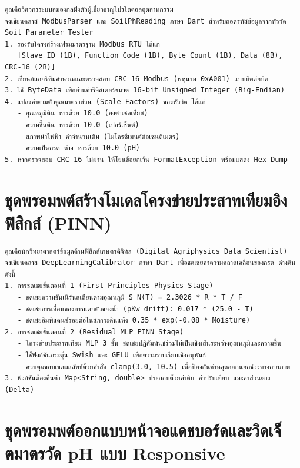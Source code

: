 \begin{promptbox}[title={พรอมพต์ ก.2 การเขียนโมดูลถอดรหัส Modbus RTU และตรวจสอบ CRC-16}]
\begin{lstlisting}
คุณคือวิศวกรระบบสมองกลฝังตัวผู้เชี่ยวชาญโปรโตคอลอุตสาหกรรม
จงเขียนคลาส ModbusParser และ SoilPhReading ภาษา Dart สำหรับถอดรหัสข้อมูลจากหัววัด Soil Parameter Tester
1. รองรับโครงสร้างเฟรมมาตรฐาน Modbus RTU ได้แก่
   [Slave ID (1B), Function Code (1B), Byte Count (1B), Data (8B), CRC-16 (2B)]
2. เขียนอัลกอริทึมคำนวณและตรวจสอบ CRC-16 Modbus (พหุนาม 0xA001) แบบบิตต่อบิต
3. ใช้ ByteData เพื่ออ่านค่ารีจิสเตอร์ขนาด 16-bit Unsigned Integer (Big-Endian)
4. แปลงค่าตามตัวคูณมาตราส่วน (Scale Factors) ของหัววัด ได้แก่
   - อุณหภูมิดิน หารด้วย 10.0 (องศาเซลเซียส)
   - ความชื้นดิน หารด้วย 10.0 (เปอร์เซ็นต์)
   - สภาพนำไฟฟ้า ค่าจำนวนเต็ม (ไมโครซีเมนต์ต่อเซนติเมตร)
   - ความเป็นกรด-ด่าง หารด้วย 10.0 (pH)
5. หากตรวจสอบ CRC-16 ไม่ผ่าน ให้โยนข้อยกเว้น FormatException พร้อมแสดง Hex Dump
\end{lstlisting}
\end{promptbox}

\section{ชุดพรอมพต์สร้างโมเดลโครงข่ายประสาทเทียมอิงฟิสิกส์ (PINN)}

\begin{promptbox}[title={พรอมพต์ ก.3 การสร้างโมเดล Two-Stage Decoupling PINN บนอุปกรณ์ฝังตัว}]
\begin{lstlisting}
คุณคือนักวิทยาศาสตร์ข้อมูลด้านฟิสิกส์เกษตรดิจิทัล (Digital Agriphysics Data Scientist)
จงเขียนคลาส DeepLearningCalibrator ภาษา Dart เพื่อชดเชยค่าความคลาดเคลื่อนของกรด-ด่างดิน ดังนี้
1. การชดเชยขั้นตอนที่ 1 (First-Principles Physics Stage)
   - ชดเชยความชันเนิร์นสเตียนตามอุณหภูมิ S_N(T) = 2.3026 * R * T / F
   - ชดเชยการเลื่อนของการแตกตัวของน้ำ (pKw drift): 0.017 * (25.0 - T)
   - ชดเชยอิมพีแดนซ์รอยต่อในสภาวะดินแห้ง 0.35 * exp(-0.08 * Moisture)
2. การชดเชยขั้นตอนที่ 2 (Residual MLP PINN Stage)
   - โครงข่ายประสาทเทียม MLP 3 ชั้น ชดเชยปฏิสัมพันธ์ร่วมไม่เป็นเชิงเส้นระหว่างอุณหภูมิและความชื้น
   - ใช้ฟังก์ชันกระตุ้น Swish และ GELU เพื่อความราบเรียบเชิงอนุพันธ์
   - ควบคุมขอบเขตผลลัพธ์ด้วยคำสั่ง clamp(3.0, 10.5) เพื่อป้องกันค่าหลุดออกนอกช่วงทางกายภาพ
3. ฟังก์ชันต้องคืนค่า Map<String, double> ประกอบด้วยค่าดิบ ค่าปรับเทียบ และค่าส่วนต่าง (Delta)
\end{lstlisting}
\end{promptbox}

\section{ชุดพรอมพต์ออกแบบหน้าจอแดชบอร์ดและวิดเจ็ตมาตรวัด pH แบบ Responsive}

